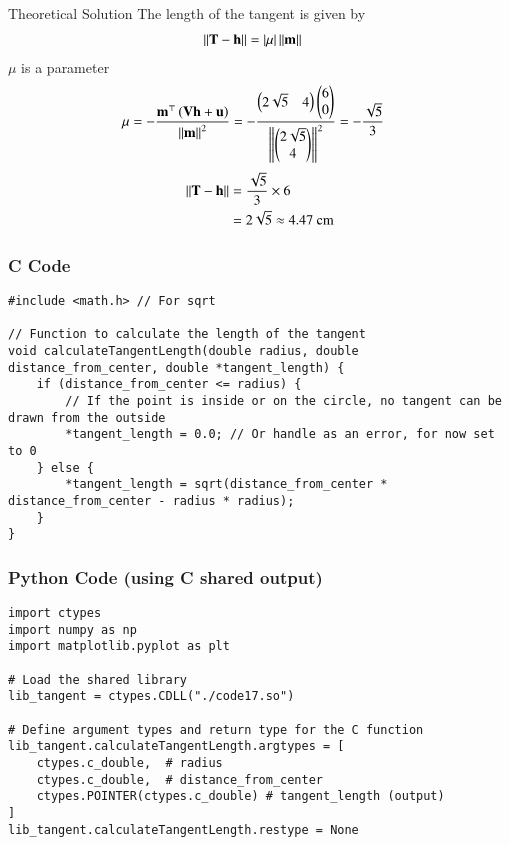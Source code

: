 \documentclass{beamer}
\begin{document}
\begin{frame}{Theoretical Solution}
The length of the tangent is given by
\begin{align}
    \left\lVert\mathbf{T}-\mathbf{h}\right\rVert&=\left\vert\mu\right\vert \left\lVert\mathbf{m}\right\rVert
 \end{align}   
$\mu$ is a parameter
\begin{align}
    \mu&= -\dfrac{\mathbf{m}^{\top} \left(\mathbf{V}\mathbf{h} + \mathbf{u}\right)}{\left\lVert\mathbf{m}\right\rVert^2}=-\dfrac{\begin{pmatrix}2\sqrt{5} & 4\end{pmatrix} \begin{pmatrix}6\\0\end{pmatrix}}{\left\lVert\begin{pmatrix}2\sqrt{5} \\ 4\end{pmatrix}\right\rVert^2}=-\dfrac{\sqrt{5}}{3}
\end{align}
\begin{align}
    \left\lVert\mathbf{T}-\mathbf{h}\right\rVert&=\dfrac{\sqrt{5}}{3} \times 6 \\
    &=2\sqrt{5} \approx 4.47 \text{ cm}
\end{align}
\end{frame}

\begin{frame}[fragile]
\frametitle{C Code}
\begin{lstlisting}
#include <math.h> // For sqrt

// Function to calculate the length of the tangent
void calculateTangentLength(double radius, double distance_from_center, double *tangent_length) {
    if (distance_from_center <= radius) {
        // If the point is inside or on the circle, no tangent can be drawn from the outside
        *tangent_length = 0.0; // Or handle as an error, for now set to 0
    } else {
        *tangent_length = sqrt(distance_from_center * distance_from_center - radius * radius);
    }
}
\end{lstlisting}
\end{frame}

\begin{frame}[fragile]
\frametitle{Python Code (using C shared output)}
\begin{lstlisting}
import ctypes
import numpy as np
import matplotlib.pyplot as plt

# Load the shared library
lib_tangent = ctypes.CDLL("./code17.so")

# Define argument types and return type for the C function
lib_tangent.calculateTangentLength.argtypes = [
    ctypes.c_double,  # radius
    ctypes.c_double,  # distance_from_center
    ctypes.POINTER(ctypes.c_double) # tangent_length (output)
]
lib_tangent.calculateTangentLength.restype = None
\end{lstlisting}
\end{frame}
\end{document}
